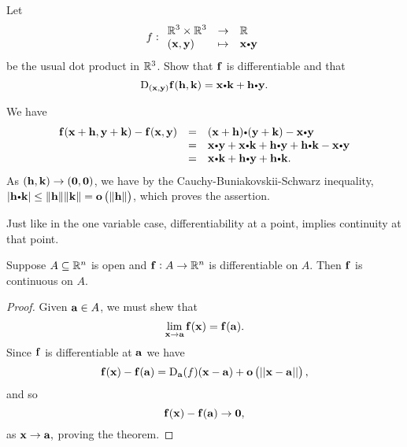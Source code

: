 \begin{exa}
Let $$\fun{f}{(\vector{x},
\vector{y})}{\vector{x}\bp\vector{y}}{\reals^3 \times
\reals^3}{\reals}$$ be the usual dot product in $\mathbb{R}^3$. Show
that $\mathbf{ f}$ is differentiable and that $$\mathrm{D}_{(\vector{x},
\vector{y})}\funvect{f}(\vector{h}, \vector{k}) = \vector{x}\bp\vector{k} +
\vector{h}\bp\vector{y}.$$
\end{exa}
\begin{solu} We have
$$\begin{array}{lll}
\funvect{f}(\vector{x}+\vector{h}, \vector{y}+\vector{k}) - \funvect{f}(\vector{x},
\vector{y}) & = & (\vector{x} + \vector{h})\bp (\vector{y} +
\vector{k}) -
\vector{x}\bp\vector{y} \\
& = & \vector{x}\bp\vector{y} + \vector{x}\bp\vector{k} +
\vector{h}\bp\vector{y} +
\vector{h}\bp\vector{k} - \vector{x}\bp\vector{y} \\
& = &  \vector{x}\bp\vector{k} + \vector{h}\bp\vector{y} + \vector{h}\bp\vector{k}. \\
\end{array}$$As $(\mathbf{ h}, \mathbf{ k}) \rightarrow (\mathbf{ 0},
\mathbf{ 0})$, we have by the Cauchy-Buniakovskii-Schwarz inequality,
$|\vector{h}\bp\vector{k}| \leq \norm{\vector{h}}\norm{\vector{k}} =
\smallosans{\norm{\vector{h}}}$, which proves the assertion.
\end{solu}




        Just like in the one variable case, differentiability at a
point, implies continuity at that point.
\begin{thm}
Suppose $A\subseteq \mathbb{R}^n$ is open and $\mathbf{ f}:A \rightarrow \mathbb{R}^n$
is differentiable on $A$. Then $\mathbf{ f}$ is continuous on $A$.
\end{thm}
\begin{proof}
Given ${\mathbf a}\in A$, we must shew that
$$ \lim_{{\mathbf x} \rightarrow {\mathbf a}} \mathbf{ f}({\mathbf x}) =
\mathbf{ f}({\mathbf a}).$$ Since $\mathbf{ f}$ is differentiable at ${\mathbf a}$ we have
$$ \mathbf{ f}({\mathbf x}) - \mathbf{ f}({\mathbf a})= {\mathrm{D}}_{{\mathbf a}}(f)({\mathbf x} - {\mathbf a}) + {\mathbf o}\left(||{\mathbf x} -
{\mathbf a}||\right),$$and so
$$\mathbf{ f}({\mathbf x}) - \mathbf{ f}({\mathbf a})\rightarrow {\mathbf 0},$$as ${\mathbf x} \rightarrow
{\mathbf a},$ proving the theorem.
\end{proof}

 

\bigskip

